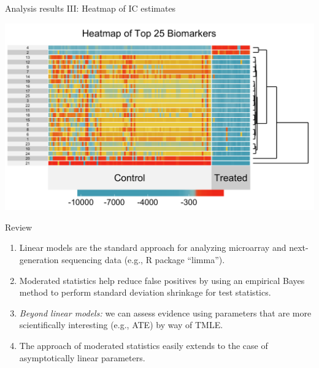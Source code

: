 \documentclass[12pt,t]{beamer}
\begin{document}
\begin{frame}[c]{Analysis results III: Heatmap of IC estimates}

\begin{center}
  \includegraphics[scale=0.45]{Figs/superheatmap.png}
\end{center}

\end{frame}



\begin{frame}[c]{Review}
\begin{center}
\begin{enumerate}
  \itemsep12pt
  \item Linear models are the standard approach for analyzing microarray and
    next-generation sequencing data (e.g., R package ``limma'').
  \item Moderated statistics help reduce false positives by using an empirical
    Bayes method to perform standard deviation shrinkage for test statistics.
  \item \textit{Beyond linear models:} we can assess evidence using parameters
    that are more scientifically interesting (e.g., ATE) by way of TMLE.
  \item The approach of moderated statistics easily extends to the case of
    asymptotically linear parameters.
\end{enumerate}
\end{center}


\end{frame}
\end{document}
